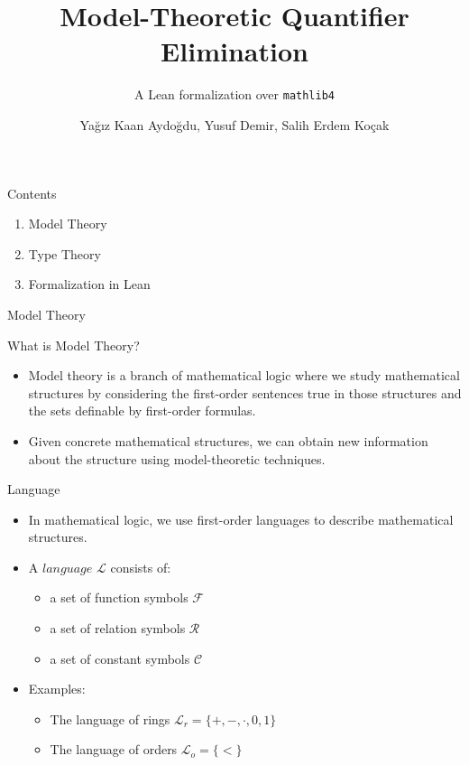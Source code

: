 \documentclass[aspectratio=169,11pt]{beamer}
\title{Model-Theoretic Quantifier Elimination}
\subtitle{A Lean formalization over \texttt{mathlib4}}
\author{Yağız Kaan Aydoğdu, Yusuf Demir, Salih Erdem Koçak}
\institute{Advisors: Ayhan Günaydın, Metin Ersin Arıcan}
\date{}
\newcommand{\partslide}[1]{%
  \begin{frame}[plain]
    \centering
    \vfill
    {\usebeamerfont{section title}\color{accent}#1}
    \vfill
  \end{frame}
}
\begin{document}
\begin{frame}[plain]
  \titlepage
\end{frame}

\begin{frame}{Contents}
  \begin{enumerate}
    \item Model Theory
    \item Type Theory
    \item Formalization in Lean
  \end{enumerate}
\end{frame}

\partslide{Model Theory}

\begin{frame}{What is Model Theory?}
  \begin{itemize}
    \item Model theory is a branch of mathematical logic where we study mathematical structures by considering the first-order sentences true in those structures and the sets definable by first-order formulas.
    \item Given concrete mathematical structures, we can obtain new information about the structure using model-theoretic techniques.
  \end{itemize}
\end{frame}

\begin{frame}{Language}
  \begin{itemize}
    \item In mathematical logic, we use first-order languages to describe mathematical structures.
    \item A $\mathit{language}$ $\mathcal{L}$ consists of:
      \begin{itemize}
        \item a set of function symbols $\mathcal{F}$
        \item a set of relation symbols $\mathcal{R}$
        \item a set of constant symbols $\mathcal{C}$
      \end{itemize}
    \item Examples:
      \begin{itemize}
        \item The language of rings $\mathcal{L}_r = \{+, -, \cdot, 0, 1\}$
        \item The language of orders $\mathcal{L}_o = \{<\}$
      \end{itemize}
  \end{itemize}
\end{frame}
\end{document}
